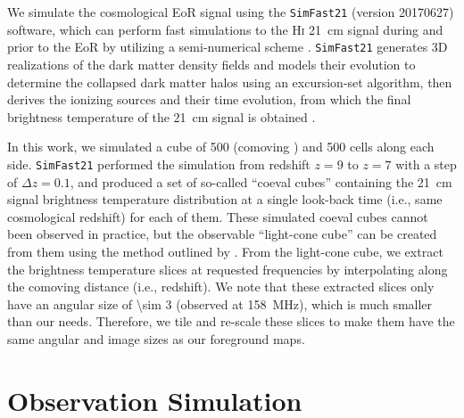 \documentclass[modern]{aastex61}
\newcommand{\Hi}{H\textsc{i}}
\begin{document}
We simulate the cosmological EoR signal using the \texttt{SimFast21}
(version 20170627) software, which can perform fast simulations to the
\Hi{} \SI{21}{\cm} signal during and prior to the EoR by utilizing a
semi-numerical scheme \citep{santos2010,hassan2016}.
\texttt{SimFast21} generates 3D realizations of the dark matter density
fields and models their evolution to determine the collapsed dark matter
halos using an excursion-set algorithm, then derives the ionizing sources
and their time evolution, from which the final brightness temperature of
the \SI{21}{\cm} signal is obtained \citep{santos2010}.

In this work, we simulated a cube of \SI{500}{\cMpc} (comoving \si{\Mpc})
and 500 cells along each side.  \texttt{SimFast21} performed the
simulation from redshift $z=9$ to $z=7$ with a step of $\Delta z = 0.1$,
and produced a set of so-called \enquote{coeval cubes} containing the
\SI{21}{\cm} signal brightness temperature distribution at a single
look-back time (i.e., same cosmological redshift) for each of them.
These simulated coeval cubes cannot been observed in practice, but the
observable \enquote{light-cone cube} can be created from them using the
method outlined by \citet{datta2012}.
From the light-cone cube, we extract the brightness temperature slices
at requested frequencies by interpolating along the comoving distance
(i.e., redshift).
We note that these extracted slices only have an angular size of
\SI{\sim 3}{\deg} (observed at \SI{158}{\MHz}), which is much smaller
than our needs.  Therefore, we tile and re-scale these slices to make
them have the same angular and image sizes as our foreground maps.


\section{Observation Simulation}
\label{sec:obs-simulation}
\end{document}

